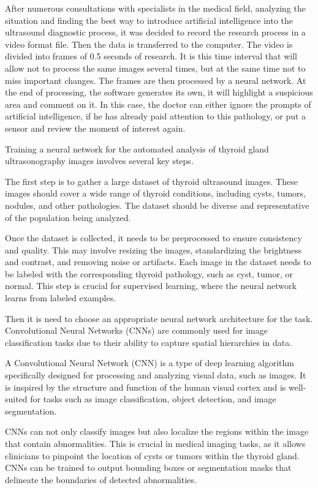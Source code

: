 \documentclass[a4paper,10pt,twocolumn]{article}
\begin{document}
After numerous consultations with specialists in the
medical field, analyzing the situation and finding the best
way to introduce artificial intelligence into the ultrasound
diagnostic process, it was decided to record the research
process in a video format file. Then the data is transferred
to the computer. The video is divided into frames of
0.5 seconds of research. It is this time interval that will
allow not to process the same images several times, but
at the same time not to miss important changes. The
frames are then processed by a neural network. At the
end of processing, the software generates its own, it
will highlight a suspicious area and comment on it. In
this case, the doctor can either ignore the prompts of
artificial intelligence, if he has already paid attention to
this pathology, or put a sensor and review the moment
of interest again.

Training a neural network for the automated analysis
of thyroid gland ultrasonography images involves several
key steps.

The first step is to gather a large dataset of thyroid ultrasound images. These images should cover a wide range
of thyroid conditions, including cysts, tumors, nodules,
and other pathologies. The dataset should be diverse and
representative of the population being analyzed.

Once the dataset is collected, it needs to be preprocessed to ensure consistency and quality. This may
involve resizing the images, standardizing the brightness
and contrast, and removing noise or artifacts. Each image
in the dataset needs to be labeled with the corresponding
thyroid pathology, such as cyst, tumor, or normal. This
step is crucial for supervised learning, where the neural
network learns from labeled examples.

Then it is need to choose an appropriate neural
network architecture for the task. Convolutional Neural
Networks (CNNs) are commonly used for image classification tasks due to their ability to capture spatial
hierarchies in data.

A Convolutional Neural Network (CNN) is a type
of deep learning algorithm specifically designed for
processing and analyzing visual data, such as images. It
is inspired by the structure and function of the human
visual cortex and is well-suited for tasks such as image
classification, object detection, and image segmentation.

CNNs can not only classify images but also localize
the regions within the image that contain abnormalities.
This is crucial in medical imaging tasks, as it allows
clinicians to pinpoint the location of cysts or tumors
within the thyroid gland. CNNs can be trained to output
bounding boxes or segmentation masks that delineate the
boundaries of detected abnormalities.
\end{document}
